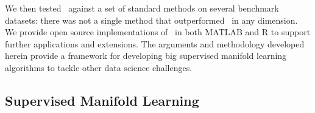 \documentclass[10pt]{article}
\begin{document}
We then tested \Lol~against a set of standard methods on  several benchmark datasets:  there was not a single method that outperformed \Lol~in any dimension.
We provide open source implementations of \Lol~in both MATLAB and R to support further applications and extensions.  
The arguments and methodology developed herein provide a framework for developing big supervised manifold learning algorithms to tackle other data science challenges.





\subsection*{Supervised Manifold Learning}
\end{document}
